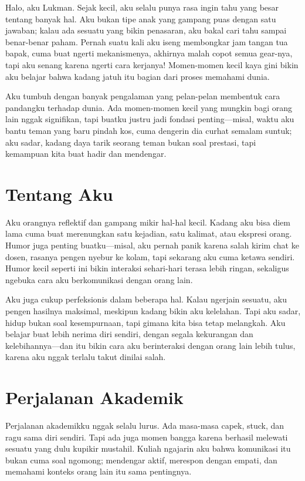 \documentclass[
  letterpaper,
  DIV=11,
  numbers=noendperiod]{scrreprt}
\begin{document}
Halo, aku Lukman. Sejak kecil, aku selalu punya rasa ingin tahu yang
besar tentang banyak hal. Aku bukan tipe anak yang gampang puas dengan
satu jawaban; kalau ada sesuatu yang bikin penasaran, aku bakal cari
tahu sampai benar-benar paham. Pernah suatu kali aku iseng membongkar
jam tangan tua bapak, cuma buat ngerti mekanismenya, akhirnya malah
copot semua gear-nya, tapi aku senang karena ngerti cara kerjanya!
Momen-momen kecil kaya gini bikin aku belajar bahwa kadang jatuh itu
bagian dari proses memahami dunia.

Aku tumbuh dengan banyak pengalaman yang pelan-pelan membentuk cara
pandangku terhadap dunia. Ada momen-momen kecil yang mungkin bagi orang
lain nggak signifikan, tapi buatku justru jadi fondasi penting---misal,
waktu aku bantu teman yang baru pindah kos, cuma dengerin dia curhat
semalam suntuk; aku sadar, kadang daya tarik seorang teman bukan soal
prestasi, tapi kemampuan kita buat hadir dan mendengar.

\section{Tentang Aku}\label{tentang-aku}

Aku orangnya reflektif dan gampang mikir hal-hal kecil. Kadang aku bisa
diem lama cuma buat merenungkan satu kejadian, satu kalimat, atau
ekspresi orang. Humor juga penting buatku---misal, aku pernah panik
karena salah kirim chat ke dosen, rasanya pengen nyebur ke kolam, tapi
sekarang aku cuma ketawa sendiri. Humor kecil seperti ini bikin
interaksi sehari-hari terasa lebih ringan, sekaligus ngebuka cara aku
berkomunikasi dengan orang lain.

Aku juga cukup perfeksionis dalam beberapa hal. Kalau ngerjain sesuatu,
aku pengen hasilnya maksimal, meskipun kadang bikin aku kelelahan. Tapi
aku sadar, hidup bukan soal kesempurnaan, tapi gimana kita bisa tetap
melangkah. Aku belajar buat lebih nerima diri sendiri, dengan segala
kekurangan dan kelebihannya---dan itu bikin cara aku berinteraksi dengan
orang lain lebih tulus, karena aku nggak terlalu takut dinilai salah.

\section{Perjalanan Akademik}\label{perjalanan-akademik}

Perjalanan akademikku nggak selalu lurus. Ada masa-masa capek, stuck,
dan ragu sama diri sendiri. Tapi ada juga momen bangga karena berhasil
melewati sesuatu yang dulu kupikir mustahil. Kuliah ngajarin aku bahwa
komunikasi itu bukan cuma soal ngomong; mendengar aktif, merespon dengan
empati, dan memahami konteks orang lain itu sama pentingnya.
\end{document}
